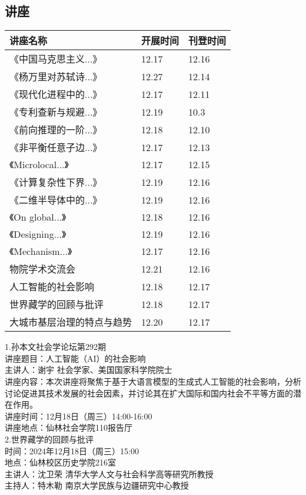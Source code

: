 \documentclass[letterpaper, 12pt]{article}
\begin{document}
\begin{multicols}{2}

\section{讲座}
\begin{tabularx}{0.5\textwidth}{|X|X|X|}
    \hline
    讲座名称 & 开展时间 & 刊登时间\\
    \hline\hline
《中国马克思主义...》& 12.17 & 12.16\\\hline
《杨万里对苏轼诗...》 & 12.27 & 12.14\\\hline
《现代化进程中的...》 & 12.17 & 12.11\\\hline
《专利查新与规避...》 & 12.19 & 10.3\\\hline
《前向推理的一阶...》 & 12.18 & 12.10\\\hline
《非平衡任意子边...》 & 12.17 & 12.13\\\hline
《Microlocal...》 & 12.17 & 12.15\\\hline
《计算复杂性下界...》 & 12.19 & 12.16\\\hline
《二维半导体中的...》 & 12.19 & 12.16\\\hline
《On global...》 & 12.18 & 12.16\\\hline
《Designing...》 & 12.19 & 12.16\\\hline
《Mechanism...》 & 12.17 & 12.16\\\hline
物院学术交流会 & 12.21 & 12.16\\\hline
人工智能的社会影响 & 12.18 & 12.17\\\hline
世界藏学的回顾与批评 & 12.18 & 12.17\\\hline
大城市基层治理的特点与趋势 & 12.20 & 12.17\\\hline
\end{tabularx}
1.孙本文社会学论坛第292期\\
讲座题目：人工智能（AI）的社会影响\\
主讲人：谢宇 社会学家、美国国家科学院院士\\
讲座内容：本次讲座将聚焦于基于大语言模型的生成式人工智能的社会影响，分析讨论促进其技术发展的社会因素，并讨论其在扩大国际和国内社会不平等方面的潜在作用。\\
讲座时间：12月18日（周三）14:00-16:00\\
讲座地点：仙林社会学院110报告厅\\

2.世界藏学的回顾与批评\\
时间：2024年12月18日（周三）15:00\\
地点：仙林校区历史学院216室\\
主讲人：沈卫荣 清华大学人文与社会科学高等研究所教授\\
主持人：特木勒 南京大学民族与边疆研究中心教授\\


\end{multicols}
\end{document}
